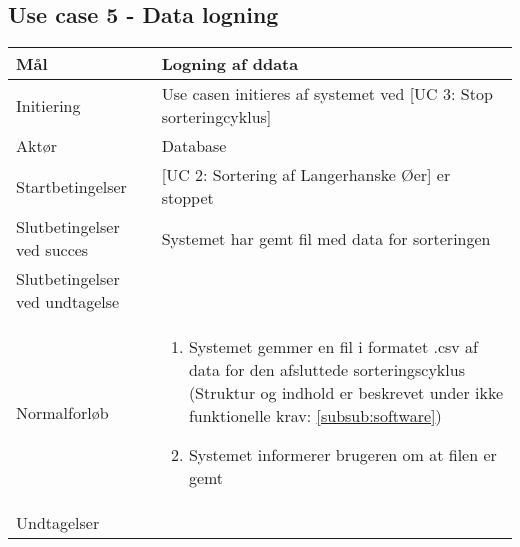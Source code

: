 \subsection{Use case 5 - Data logning}
\begin{center}
		\begin{longtable}{ | m{4cm} | m{8cm}| } 
			\hline
			Mål & Logning af ddata \\ 
			\hline
			Initiering &  Use casen initieres af systemet ved [UC 3: Stop sorteringcyklus]\\
			\hline
			Aktør & Database \\ 
			\hline
			Startbetingelser & [UC 2: Sortering af Langerhanske Øer] er stoppet \\
			\hline	
			Slutbetingelser ved succes & Systemet har gemt fil med data for sorteringen \\
			\hline
			Slutbetingelser ved undtagelse &  \\
			\hline
			Normalforløb & \begin{enumerate}
				\item Systemet gemmer en fil i formatet .csv af data for den afsluttede sorteringscyklus (Struktur og indhold er beskrevet under ikke funktionelle krav: \ref{subsub:software})
				
				\item 	Systemet informerer brugeren om at filen er gemt
			\end{enumerate} \\ 
			\hline
			Undtagelser & \\
			\hline
		\end{longtable}
		
	\end{center}
	\pagebreak